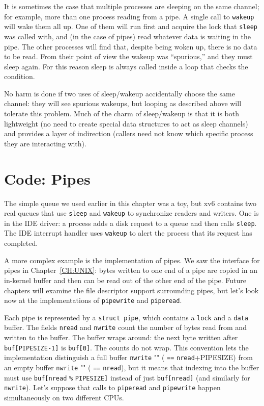 It is sometimes the case that multiple processes are sleeping
on the same channel; for example, more than one process
reading from a pipe.
A single call to 
\lstinline{wakeup}
will wake them all up.
One of them will run first and acquire the lock that
\lstinline{sleep}
was called with, and (in the case of pipes) read whatever
data is waiting in the pipe.
The other processes will find that, despite being woken up,
there is no data to be read.
From their point of view the wakeup was ``spurious,'' and
they must sleep again.
For this reason sleep is always called inside a loop that
checks the condition.

No harm is done if two uses of sleep/wakeup accidentally
choose the same channel: they will see spurious wakeups,
but looping as described above will tolerate this problem.
Much of the charm of sleep/wakeup is that it is both
lightweight (no need to create special data
structures to act as sleep channels) and provides a layer
of indirection (callers need not know which specific process
they are interacting with).
\section{Code: Pipes}
The simple queue we used earlier in this chapter
was a toy, but xv6 contains two real queues
that use
\lstinline{sleep}
and
\lstinline{wakeup}
to synchronize readers and writers.
One is in the IDE driver: a process adds a disk request to a queue and then
calls
\lstinline{sleep}.
The IDE interrupt handler uses
\lstinline{wakeup}
to alert the process that its request has completed.

A more complex example is the implementation of pipes.
We saw the interface for pipes in Chapter~\ref{CH:UNIX}:
bytes written to one end of a pipe are copied
in an in-kernel buffer and then can be read out
of the other end of the pipe.
Future chapters will examine the file descriptor support
surrounding pipes, but let's look now at the
implementations of 
\lstinline{pipewrite}
and
\lstinline{piperead}.

Each pipe
is represented by a 
\lstinline{struct pipe},
which contains
a 
\lstinline{lock}
and a 
\lstinline{data}
buffer.
The fields
\lstinline{nread}
and
\lstinline{nwrite}
count the number of bytes read from
and written to the buffer.
The buffer wraps around:
the next byte written after
\lstinline{buf[PIPESIZE-1]}
is 
\lstinline{buf[0]}.
The counts do not wrap.
This convention lets the implementation
distinguish a full buffer 
\lstinline{nwrite} "" (
\lstinline{==}
\lstinline{nread}+PIPESIZE)
from an empty buffer
\lstinline{nwrite} "" (
\lstinline{==}
\lstinline{nread}),
but it means that indexing into the buffer
must use
\lstinline{buf[nread}
\lstinline{%}
\lstinline{PIPESIZE]}
instead of just
\lstinline{buf[nread]} 
(and similarly for
\lstinline{nwrite}).
Let's suppose that calls to
\lstinline{piperead}
and
\lstinline{pipewrite}
happen simultaneously on two different CPUs.

